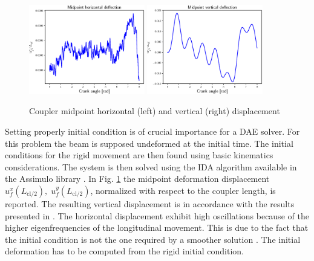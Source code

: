 \documentclass{svjour3}                     %
\begin{document}
\begin{figure}[tb]
	\centering
	\includegraphics[width=0.45\textwidth]{uM_disp.eps} 
	\includegraphics[width=0.45\textwidth]{wM_disp.eps} 
	\caption{Coupler midpoint horizontal (left) and vertical (right) displacement}
	\label{fig:defM_crsl}
\end{figure}

Setting properly initial condition is of crucial importance for a DAE solver. For this problem the beam is supposed undeformed at the initial time. The initial conditions for the rigid movement are then found using basic kinematics considerations.  The system is then solved using the IDA algorithm available in the Assimulo library \cite{assimulo}. In Fig. \ref{fig:defM_crsl} the midpoint deformation displacement $u_f^x(L_{\text{cl}/2}),\; u_f^y(L_{\text{cl}/2})$, normalized with respect to the coupler length, is reported. The resulting vertical displacement is in accordance with the results presented in \cite{Ellenbroek2018}. The horizontal displacement exhibit high oscillations because of the higher eigenfrequencies of the longitudinal movement. This is due to the fact that the initial condition is not the one required by a smoother solution \cite{MB_Daepde}. The initial deformation has to be computed from the rigid initial condition.
\end{document}
